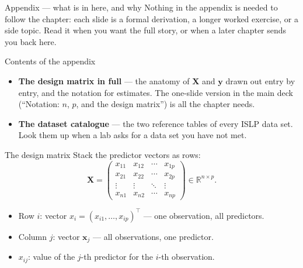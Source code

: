 \documentclass[aspectratio=169,11pt]{beamer}
\begin{document}
\begin{frame}{Appendix --- what is in here, and why}
  \small
  Nothing in the appendix is needed to follow the chapter: each slide is a
  formal derivation, a longer worked exercise, or a side topic. Read it when
  you want the full story, or when a later chapter sends you back here.
  \begin{block}{Contents of the appendix}
    \begin{itemize}
      \item \textbf{The design matrix in full} --- the anatomy of $\mathbf{X}$ and $\mathbf{y}$ drawn out entry by entry, and the notation for estimates. The one-slide version in the main deck (``Notation: $n$, $p$, and the design matrix'') is all the chapter needs.
      \item \textbf{The dataset catalogue} --- the two reference tables of every ISLP data set. Look them up when a lab asks for a data set you have not met.
    \end{itemize}
  \end{block}
\end{frame}

\begin{frame}{The design matrix}
  Stack the predictor vectors as rows:
  \[
    \boxed{\;
      \mathbf{X} =
      \begin{pmatrix}
        x_{11} & x_{12} & \cdots & x_{1p} \\
        x_{21} & x_{22} & \cdots & x_{2p} \\
        \vdots & \vdots & \ddots & \vdots \\
        x_{n1} & x_{n2} & \cdots & x_{np}
      \end{pmatrix} \in \mathbb{R}^{n\times p}.
    \;}
  \]
  \begin{readme}
    \begin{itemize}
      \item Row $i$: vector $x_i = (x_{i1}, \ldots, x_{ip})^\top$ ---
            one observation, all predictors.
      \item Column $j$: vector $\mathbf{x}_j$ --- all observations, one
            predictor.
      \item $x_{ij}$: value of the $j$-th predictor for the $i$-th
            observation.
    \end{itemize}
  \end{readme}
\end{frame}
\end{document}
